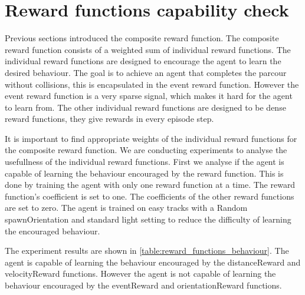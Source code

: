 
\section{Reward functions capability check}

Previous sections introduced the composite reward function. The composite reward function consists of a weighted sum of individual reward functions. The individual reward functions are designed to encourage the agent to learn the desired behaviour. The goal is to achieve an agent that completes the parcour without collisions, this is encapsulated in the event reward function. However the event reward function is a very sparse signal, which makes it hard for the agent to learn from. The other individual reward functions are designed to be dense reward functions, they give rewards in every episode step.

It is important to find appropriate weights of the individual reward functions for the composite reward function. We are conducting experiments to analyse the usefullness of the individual reward functions. First we analyse if the agent is capable of learning the behaviour encouraged by the reward function.
This is done by training the agent with only one reward function at a time. The reward function's coefficient is set to one. The coefficients of the other reward functions are set to zero. The agent is trained on easy tracks with a Random spawnOrientation and standard light setting to reduce the difficulty of learning the encouraged behaviour.


The experiment results are shown in \ref{table:reward_functions_behaviour}. The agent is capable of learning the behaviour encouraged by the distanceReward and velocityReward functions. However the agent is not capable of learning the behaviour encouraged by the eventReward and orientationReward functions.


